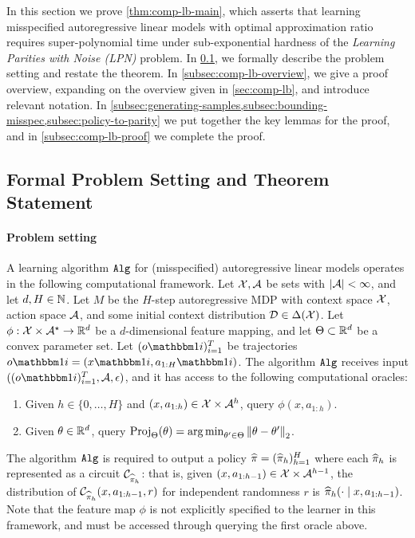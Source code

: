 


In this section we prove \cref{thm:comp-lb-main}, which asserts that learning misspecified autoregressive linear models with optimal approximation ratio requires super-polynomial time under sub-exponential hardness of the \emph{Learning Parities with Noise (LPN)} problem. In \cref{subsec:comp-lb-setting}, we formally describe the problem setting and restate the theorem. In \cref{subsec:comp-lb-overview}, we give a proof overview, expanding on the overview given in \cref{sec:comp-lb}, and introduce relevant notation. In \cref{subsec:generating-samples,subsec:bounding-misspec,subsec:policy-to-parity} we put together the key lemmas for the proof, and in \cref{subsec:comp-lb-proof} we complete the proof.

\subsection{Formal Problem Setting and Theorem Statement}\label{subsec:comp-lb-setting}

\paragraph{Problem setting} A learning algorithm $\texttt{Alg}$ for (misspecified) autoregressive linear models operates in the following computational framework. Let $\mathcal{X},\mathcal{A}$ be sets with $|\mathcal{A}|<\infty$, and let $d,H \in \mathbb{N}$. Let $M$ be the $H$-step autoregressive MDP with context space $\mathcal{X}$, action space $\mathcal{A}$, and some initial context distribution $\mathcal{D} \in \Delta(\mathcal{X})$. Let $\phi: \mathcal{X}\times\mathcal{A}^\star \to \mathbb{R}^d$ be a $d$-dimensional feature mapping, and let $\Theta \subset \mathbb{R}^d$ be a convex parameter set. Let $(o\ind{i})_{i=1}^T$ be trajectories $o\ind{i} = (x\ind{i},a_{1:H}\ind{i})$. The algorithm $\texttt{Alg}$ receives input $((o\ind{i})_{i=1}^T, \MA, \epsilon)$, and it has access to the following computational oracles:
\begin{enumerate}
\item Given $h \in \{0,\dots,H\}$ and $(x,a_{1:h}) \in \mathcal{X}\times\mathcal{A}^h$, query $\phi(x,a_{1:h})$.
\item Given $\theta \in \mathbb{R}^d$, query $\operatorname{Proj}_\Theta(\theta) = \operatorname*{arg\,min}_{\theta'\in\Theta} \left \lVert \theta-\theta' \right \rVert_2$.
\end{enumerate}
The algorithm $\texttt{Alg}$ is required to output a policy $\widehat{\pi} = (\widehat{\pi}_h)_{h=1}^H$ where each $\widehat{\pi}_h$ is represented as a circuit $\mathcal{C}_{\widehat{\pi}_h}$: that is, given $(x,a_{1:h-1}) \in \mathcal{X}\times\mathcal{A}^{h-1}$, the distribution of $\mathcal{C}_{\widehat{\pi}_h}(x,a_{1:h-1},r)$ for independent randomness $r$ is $\widehat{\pi}_h(\cdot\mid{}x,a_{1:h-1})$. Note that the feature map $\phi$ is not explicitly specified to the learner in this framework, and must be accessed through querying the first oracle above.

